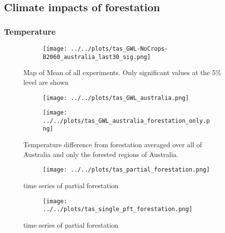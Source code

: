 \documentclass[]{article}
\begin{document}
\subsection{Climate impacts of forestation}

\subsubsection{Temperature}

\begin{figure}[H]
    \centering
    \begin{subfigure}[b]{\linewidth}
        \texttt{[image: ../../plots/tas\_GWL-NoCrops-B2060\_australia\_last30\_sig.png]}
    \end{subfigure}
    \caption{Map of Mean of all experiments. Only significant values at the 5\% level are shown}
    \label{fig:tas_australia_map}
\end{figure}

\begin{figure}[H]
    \centering
    \begin{subfigure}[b]{0.4\linewidth}
        \texttt{[image: ../../plots/tas\_GWL\_australia.png]}
    \end{subfigure}
    \begin{subfigure}[b]{0.4\linewidth}
        \texttt{[image: ../../plots/tas\_GWL\_australia\_forestation\_only.png]}
    \end{subfigure}
    \caption{Temperature difference from forestation averaged over all of Australia and only the forested regions of Australia.}
    \label{fig:tas_australia_timeseries}
\end{figure}

\begin{figure}[H]
    \centering
    \begin{subfigure}[b]{\linewidth}
        \texttt{[image: ../../plots/tas\_partial\_forestation.png]}
    \end{subfigure}
    \caption{time series of partial forestation}
    \label{fig:tas_australia_partial}
\end{figure}

\begin{figure}[H]
    \centering
    \begin{subfigure}[b]{\linewidth}
        \texttt{[image: ../../plots/tas\_single\_pft\_forestation.png]}
    \end{subfigure}
    \caption{time series of partial forestation}
    \label{fig:tas_australia_single}
\end{figure}
\end{document}
